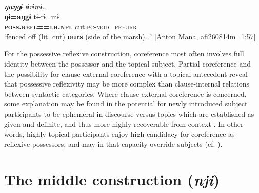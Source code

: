\documentclass[output=paper]{langscibook}
\begin{document}
\glll \textbf{\textit{ŋaŋgɨ} } \textit{tɨrɨmɨ...} \\
 \textbf{ŋɨ=aŋgɨ}  tɨ-rɨ=mɨ\\
\textbf{\textsc{poss.refl==lh.npl}} cut.\textsc{pc-mod}=\textsc{pre.irr}\\
 \glt `fenced off (lit. cut) \textbf{ours} (side of the marsh)...' [Anton Mana, afi260814m\_1:57]
\z


For the possessive reflexive construction, coreference most often involves full identity between the possessor and the topical subject. Partial coreference and the possibility for clause-external coreference with a topical antecedent reveal that possessive reflexivity may be more complex than clause-internal relations between syntactic categories. Where clause-external coreference is concerned, some explanation may be found in the potential for newly introduced subject participants to be ephemeral in discourse versus topics which are established as given and definite, and thus more highly recoverable from context \citep{Lambrecht1994}. In other words, highly topical participants enjoy high candidacy for coreference as reflexive possessors, and may in that capacity override subjects (cf. \citealt{Reesink1983}).

\section{{The} {middle} {construction} {(\textit{nji})}}\label{sec:brooks:4}
\end{document}
